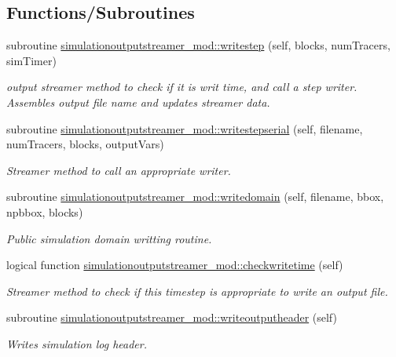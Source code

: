 \subsection*{Functions/\+Subroutines}
\begin{DoxyCompactItemize}
\item 
subroutine \mbox{\hyperlink{namespacesimulationoutputstreamer__mod_a689f65c821b78d46b142653214338b85}{simulationoutputstreamer\+\_\+mod\+::writestep}} (self, blocks, num\+Tracers, sim\+Timer)
\begin{DoxyCompactList}\small\item\em output streamer method to check if it is writ time, and call a step writer. Assembles output file name and updates streamer data. \end{DoxyCompactList}\item 
subroutine \mbox{\hyperlink{namespacesimulationoutputstreamer__mod_a0382795016b75f3724cd7483857a4ec8}{simulationoutputstreamer\+\_\+mod\+::writestepserial}} (self, filename, num\+Tracers, blocks, output\+Vars)
\begin{DoxyCompactList}\small\item\em Streamer method to call an appropriate writer. \end{DoxyCompactList}\item 
subroutine \mbox{\hyperlink{namespacesimulationoutputstreamer__mod_a2c660b4331c576befebcf037b82b8d7a}{simulationoutputstreamer\+\_\+mod\+::writedomain}} (self, filename, bbox, npbbox, blocks)
\begin{DoxyCompactList}\small\item\em Public simulation domain writting routine. \end{DoxyCompactList}\item 
logical function \mbox{\hyperlink{namespacesimulationoutputstreamer__mod_a81b788c12b0520901e6fc9b113a10dec}{simulationoutputstreamer\+\_\+mod\+::checkwritetime}} (self)
\begin{DoxyCompactList}\small\item\em Streamer method to check if this timestep is appropriate to write an output file. \end{DoxyCompactList}\item 
subroutine \mbox{\hyperlink{namespacesimulationoutputstreamer__mod_a6f01bdc663fe5f4a842150a6aac90f67}{simulationoutputstreamer\+\_\+mod\+::writeoutputheader}} (self)
\begin{DoxyCompactList}\small\item\em Writes simulation log header. \end{DoxyCompactList}\item 

\end{DoxyCompactItemize}
